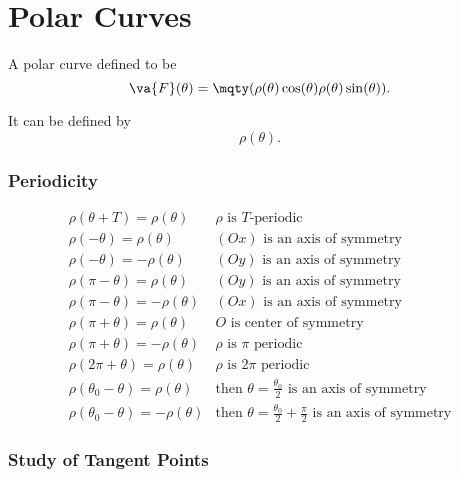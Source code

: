 \part{Polar Curves}

A polar curve defined to be
\[
	\va{F}(\theta) = \mqty(\rho(\theta)\cos(\theta) \\ \rho(\theta)\sin(\theta))
	.\]

It can be defined by
\[
	\rho(\theta)
	.\]

\section{Periodicity}
\[
	\begin{array}{l|l}
		\rho(\theta+T) = \rho(\theta)         & \rho\text{ is \(T\)-periodic}                                                         \\
		\rho(-\theta) = \rho(\theta)          & (Ox)\text{ is an axis of symmetry}                                                    \\
		\rho(-\theta) = -\rho(\theta)         & (Oy)\text{ is an axis of symmetry}                                                    \\
		\rho(\pi-\theta) = \rho(\theta)       & (Oy)\text{ is an axis of symmetry}                                                    \\
		\rho(\pi-\theta) = -\rho(\theta)      & (Ox)\text{ is an axis of symmetry}                                                    \\
		\rho(\pi+\theta) = \rho(\theta)       & O\text{ is center of symmetry}                                                        \\
		\rho(\pi+\theta) = -\rho(\theta)      & \rho\text{ is \(\pi\) periodic}                                                       \\
		\rho(2\pi+\theta) = \rho(\theta)      & \rho\text{ is \(2\pi\) periodic}                                                      \\
		\rho(\theta_0-\theta) = \rho(\theta)  & \text{then } \theta = \frac{\theta_0}{2} \text{ is an axis of symmetry}               \\
		\rho(\theta_0-\theta) = -\rho(\theta) & \text{then } \theta = \frac{\theta_0}{2}+\frac{\pi}{2} \text{ is an axis of symmetry}
	\end{array}
\]
\section{Study of Tangent Points}

